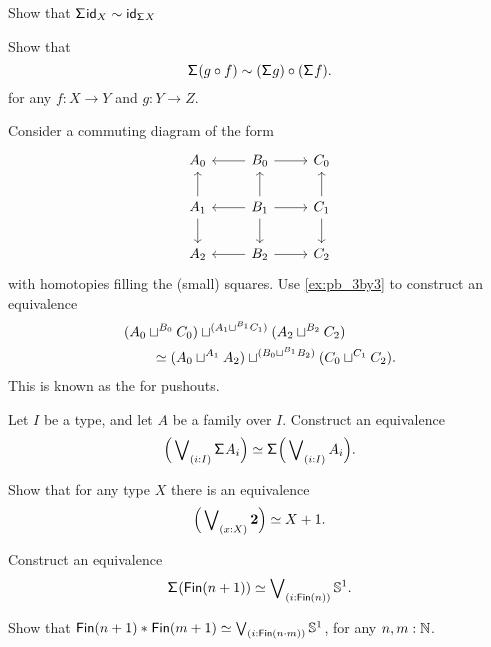 \begin{exercises}
\begin{subexenum}
\item Show that $\susp \idfunc[X]\htpy\idfunc[\susp X]$
\item Show that
\begin{equation*}
\susp(g\circ f)\htpy (\susp g)\circ (\susp f).
\end{equation*}
for any $f:X\to Y$ and $g:Y\to Z$.
\end{subexenum}
\item Consider a commuting diagram of the form
\begin{equation*}
\begin{tikzcd}
A_0 & B_0 \arrow[l] \arrow[r] & C_0 \\
A_1 \arrow[u] \arrow[d] & B_1 \arrow[u] \arrow[r] \arrow[d] \arrow[l] & C_1 \arrow[u] \arrow[d] \\
A_2 & B_2 \arrow[l] \arrow[r] & C_2
\end{tikzcd}
\end{equation*}
with homotopies filling the (small) squares. Use \cref{ex:pb_3by3} to construct an equivalence
\begin{align*}
& (A_0\sqcup^{B_0} C_0) \sqcup^{(A_1\sqcup^{B_1} C_1)} (A_2 \sqcup^{B_2} C_2) \\
& \qquad \eqvsym (A_0 \sqcup^{A_1} A_2) \sqcup^{(B_0\sqcup^{B_1} B_2)} (C_0\sqcup^{C_1} C_2).
\end{align*}
This is known as the  for pushouts.
\item 
\begin{subexenum}
\item Let $I$ be a type, and let $A$ be a family over $I$. Construct an equivalence
\begin{equation*}
\eqv{\Big(\bigvee\nolimits_{(i:I)}\susp A_i\Big)}{\susp\Big(\bigvee\nolimits_{(i:I)}A_i\Big)}.
\end{equation*}
\item Show that for any type $X$ there is an equivalence
\begin{equation*}
\eqv{\Big(\bigvee\nolimits_{(x:X)}\bool\Big)}{X+1}.
\end{equation*}
\item Construct an equivalence
\begin{equation*}
\eqv{\susp(\mathsf{Fin}(n+1))}{\bigvee\nolimits_{(i:\mathsf{Fin}(n))}\sphere{1}}.
\end{equation*}
\end{subexenum}
\item Show that $\eqv{\join{\mathsf{Fin}(n+1)}{\mathsf{Fin}(m+1)}}{\bigvee\nolimits_{(i:\mathsf{Fin}(n\cdot m))}\sphere{1}}$, for any $n,m:\N$. 
\end{exercises}
